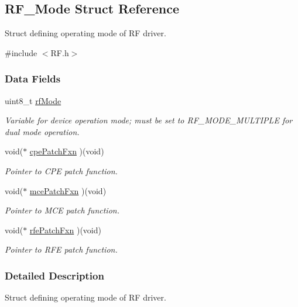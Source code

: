 \subsection{R\+F\+\_\+\+Mode Struct Reference}
\label{struct_r_f___mode}


Struct defining operating mode of R\+F driver.  




{\ttfamily \#include $<$R\+F.\+h$>$}

\subsubsection*{Data Fields}
\begin{DoxyCompactItemize}
\item 
uint8\+\_\+t \hyperlink{struct_r_f___mode_a4d6945bf75c2af234159e60ae6ef843a}{rf\+Mode}
\begin{DoxyCompactList}\small\item\em Variable for device operation mode; must be set to R\+F\+\_\+\+M\+O\+D\+E\+\_\+\+M\+U\+L\+T\+I\+P\+L\+E for dual mode operation. \end{DoxyCompactList}\item 
void($\ast$ \hyperlink{struct_r_f___mode_a2bd4297cca8b9f0fb38aae44d0ae93a5}{cpe\+Patch\+Fxn} )(void)
\begin{DoxyCompactList}\small\item\em Pointer to C\+P\+E patch function. \end{DoxyCompactList}\item 
void($\ast$ \hyperlink{struct_r_f___mode_ae3fe98ef86a6b3e1b0729288c4e8e94a}{mce\+Patch\+Fxn} )(void)
\begin{DoxyCompactList}\small\item\em Pointer to M\+C\+E patch function. \end{DoxyCompactList}\item 
void($\ast$ \hyperlink{struct_r_f___mode_a9ce1fcc0fc102f664127d8f8f21f01b9}{rfe\+Patch\+Fxn} )(void)
\begin{DoxyCompactList}\small\item\em Pointer to R\+F\+E patch function. \end{DoxyCompactList}\end{DoxyCompactItemize}


\subsubsection{Detailed Description}
Struct defining operating mode of R\+F driver. 

